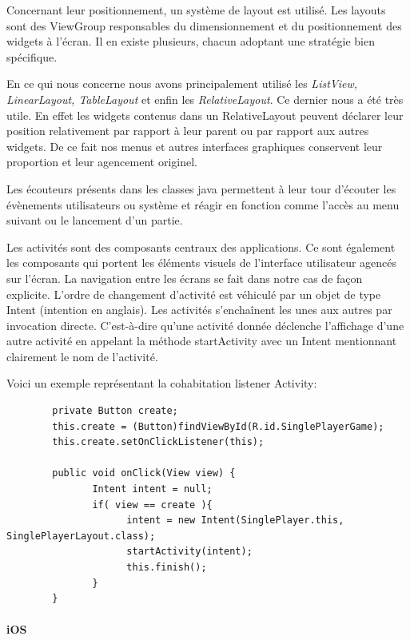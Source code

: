 		Concernant leur positionnement, un système de layout est utilisé. Les layouts sont des ViewGroup responsables
		du dimensionnement et du positionnement des widgets à l’écran. Il en existe plusieurs, 
		chacun adoptant une stratégie bien spécifique. 
		
		En ce qui nous concerne nous avons principalement utilisé les
		\textit{ListView, LinearLayout, TableLayout} et enfin les \textit{RelativeLayout}. Ce dernier nous a été très utile. En
		effet les widgets contenus dans un RelativeLayout peuvent déclarer leur position relativement
		par rapport à leur parent ou par rapport aux autres widgets. De ce fait nos
		menus et autres interfaces graphiques conservent leur proportion et leur
		agencement originel.		
		
		
		Les écouteurs présents dans les classes java permettent à leur tour d'écouter les évènements utilisateurs
		ou système et réagir en fonction comme l'accès au menu suivant ou le lancement
		d'un partie. 
		
		
		Les activités sont des composants centraux des applications. Ce sont également les
		composants qui portent les éléments visuels de l’interface utilisateur agencés
		sur l’écran. La navigation entre les écrans se fait dans notre cas de façon
		explicite. L’ordre de changement d’activité est véhiculé par un objet de type Intent (intention en anglais).
		Les activités s’enchaînent les unes aux autres par invocation directe.
		C’est-à-dire qu’une activité donnée déclenche l’affichage d’une autre activité 
		en appelant la méthode startActivity avec un Intent mentionnant clairement le nom
		de l’activité. 
		
		Voici un exemple représentant la cohabitation listener Activity:
		
		\begin{verbatim}
		private Button create;
		this.create = (Button)findViewById(R.id.SinglePlayerGame);
		this.create.setOnClickListener(this);
			
		public void onClick(View view) {
		       Intent intent = null;
		       if( view == create ){
		             intent = new Intent(SinglePlayer.this, SinglePlayerLayout.class);
		             startActivity(intent);
		             this.finish();
		       }
		}
		\end{verbatim}
		
		
		
		
		
		
	\paragraph{iOS\\}
		

